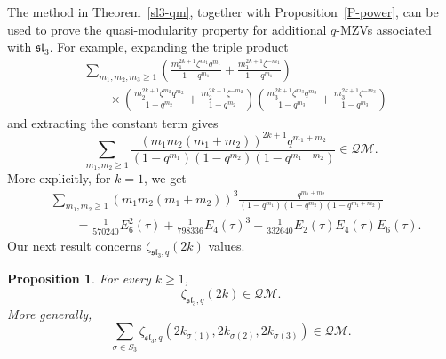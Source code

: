 \documentclass[pdftex]{sigma}
\numberwithin{equation}{section}
\newtheorem{Proposition}[Theorem]{Proposition}
\theoremstyle{definition}
\begin{document}
The method in Theorem~\ref{sl3-qm}, together with Proposition~\ref{P-power}, can be used to prove the quasi-modularity property for additional $q$-MZVs associated with $\mathfrak{sl}_3$.
For example, expanding the triple product
\begin{align*}
& \sum_{m_1,m_2,m_3 \geq 1} \left(\frac{m_1^{2k+1} \zeta^{m_1} q^{m_1}}{1-q^{m_1}} +\frac{m_1^{2k+1} \zeta^{-m_1}}{1-q^{m_1}} \right) \\
& \qquad {} \times \left(\frac{m_2^{2k+1} \zeta^{m_2} q^{m_2}}{1-q^{m_2}} +\frac{m_2^{2k+1} \zeta^{-m_2}}{1-q^{m_2}} \right)
 \left(\frac{m_3^{2k+1} \zeta^{m_3} q^{m_3}}{1-q^{m_3}} +\frac{m_3^{2k+1} \zeta^{-m_3}}{1-q^{m_3}} \right)
 \end{align*}
and extracting the constant term gives
\[
\sum_{m_1,m_2 \geq 1} \frac{\left(m_1 m_2 (m_1+m_2)\right)^{2k+1} q^{m_1+m_2} }{(1-q^{m_1})(1-q^{m_2})(1-q^{m_1+m_2})} \in \mathcal{QM}.
\]
More explicitly, for $k=1$, we get
\begin{align*}
& \sum_{m_1,m_2 \geq 1} \left( m_1 m_2 (m_1+m_2) \right)^3 \frac{q^{m_1 +m_2}}{(1-q^{m_1})(1-q^{m_2})(1-q^{m_1+m_2})} \\
& \qquad = \frac{1}{570240} E_6^2(\tau)+\frac{1}{798336} E_4(\tau)^3-\frac{1}{332640} E_2(\tau)E_4(\tau)E_6(\tau).
\end{align*}
Our next result concerns $\zeta_{\mathfrak{sl}_3,q}(2k)$ values.
\begin{Proposition} \label{sl3-qm2} For every $k \geq 1$,
\[
\zeta_{\mathfrak{sl}_3,q}(2k) \in \mathcal{QM}.
\]
More generally,
\begin{equation} \label{s3}
\sum_{ \sigma \in S_3} \zeta_{\mathfrak{sl}_3,q}(2k_{\sigma{(1)}},2k_{\sigma{(2)}},2k_{\sigma{(3)}}) \in \mathcal{QM}.
\end{equation}
\end{Proposition}
\end{document}
